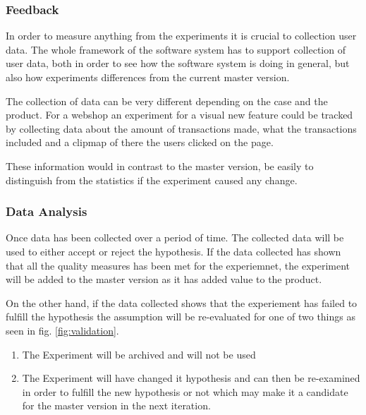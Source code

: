 \documentclass{sig-alternate}
\begin{document}
\subsubsection{Feedback}
\label{cx:feedback}
In order to measure anything from the experiments it is crucial to collection user data.
The whole framework of the software system has to support collection of user data, both in order to see how 
the software system is doing in general, but also how experiments differences from the current master version.

The collection of data can be very different depending on the case and the product. 
For a webshop an experiment for a visual new feature could be tracked by collecting data about the amount 
of transactions made, what the transactions included and a clipmap of there the users clicked on the page.

These information would in contrast to the master version, be easily to distinguish from the statistics if 
the experiment caused any change.

\subsubsection{Data Analysis}
\label{cx:analyse}
Once data has been collected over a period of time. The collected data will be used to either accept or reject
the hypothesis. 
If the data collected has shown that all the quality measures has been met for the experiemnet, 
the experiment will be added to the master version as it has added value to the product.

On the other hand, if the data collected shows that the experiement has failed to fulfill the hypothesis 
the assumption will be re-evaluated for one of two things as seen in fig. \ref{fig:validation}. 
\begin{enumerate}
\item The Experiment will be archived and will not be used
\item The Experiment will have changed it hypothesis and can then be re-examined in order to fulfill the new 
hypothesis or not which may make it a candidate for the master version in the next iteration.
\end{enumerate}
\end{document}
